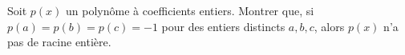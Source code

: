 Soit $p(x)$ un polynôme à coefficients entiers. Montrer que, si $p(a) = p(b) = p(c) = -1$ pour des entiers distincts $a, b, c$, alors $p(x)$ n'a pas de racine entière.
